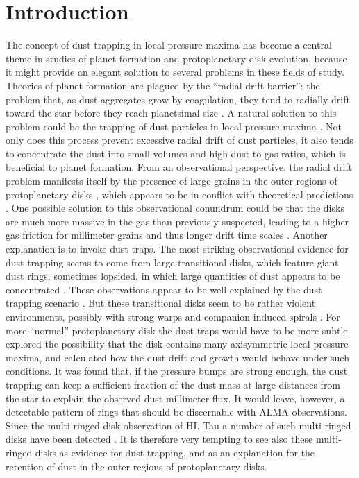\documentclass{aa}
\begin{document}
\section{Introduction}
The concept of dust trapping in local pressure maxima has become a central theme
in studies of planet formation and protoplanetary disk evolution, because it might
provide an elegant solution to several problems in these fields of
study. Theories of planet formation are plagued by the ``radial drift barrier'':
the problem that, as dust aggregates grow by coagulation, they tend to radially
drift toward the star before they reach planetsimal size
\citep[e.g.][]{2010A&A...513A..79B}. A natural solution to this problem could be
the trapping of dust particles in local pressure maxima
\citep{1972fpp..conf..211W, 2007ApJ...664L..55K, 1995A&A...295L...1B,
  1997Icar..128..213K}. Not only does this process prevent excessive radial
drift of dust particles, it also tends to concentrate the dust into small
volumes and high dust-to-gas ratios, which is beneficial to planet formation.
From an observational perspective, the radial drift
problem manifests itself by the presence of large grains in the outer regions of
protoplanetary disks \citep{2003A&A...403..323T, 2009ApJ...700.1502A}, which
appears to be in conflict with theoretical predictions
\citep{2007A&A...469.1169B}. One possible solution to this observational
conundrum could be that the disks are much more massive in the gas than
previously suspected, leading to a higher gas friction for millimeter grains and
thus longer drift time scales \citep{2017ApJ...840...93P}. Another explanation is
to invoke dust traps. The most striking observational evidence for
dust trapping seems to come from large transitional disks, which feature giant
dust rings, sometimes lopsided, in which large quantities of dust appears to be
concentrated \citep{2013Natur.493..191C, 2013Sci...340.1199V}. These observations
appear to be well explained by the dust trapping scenario
\citet{2012A&A...545A..81P}. But these transitional disks seem to be rather
violent environments, possibly with strong warps \citep{2015ApJ...798L..44M,
  2017A&A...597A..42B} and companion-induced spirals
\citep{2016ApJ...816L..12D}. For more ``normal'' protoplanetary disk the dust
traps would have to be more subtle. \cite{2012A&A...538A.114P} explored the
possibility that the disk contains many axisymmetric local pressure maxima, and
calculated how the dust drift and growth would behave under such conditions. It
was found that, if the pressure bumps are strong enough, the dust trapping can
keep a sufficient fraction of the dust mass at large distances from the star to
explain the observed dust millimeter flux. It would leave, however, a detectable
pattern of rings that should be discernable with ALMA observations.  Since the
multi-ringed disk observation of HL Tau \citep{2015ApJ...808L...3A} a number of
such multi-ringed disks have been detected \citep{2016ApJ...820L..40A,
  2016PhRvL.117y1101I, 2017ApJ...851L..23C, 2017A&A...600A..72F,
  2018A&A...610A..24F}. It is therefore very tempting to see also these
multi-ringed disks as evidence for dust trapping, and as an explanation for
the retention of dust in the outer regions of protoplanetary disks.
\end{document}
